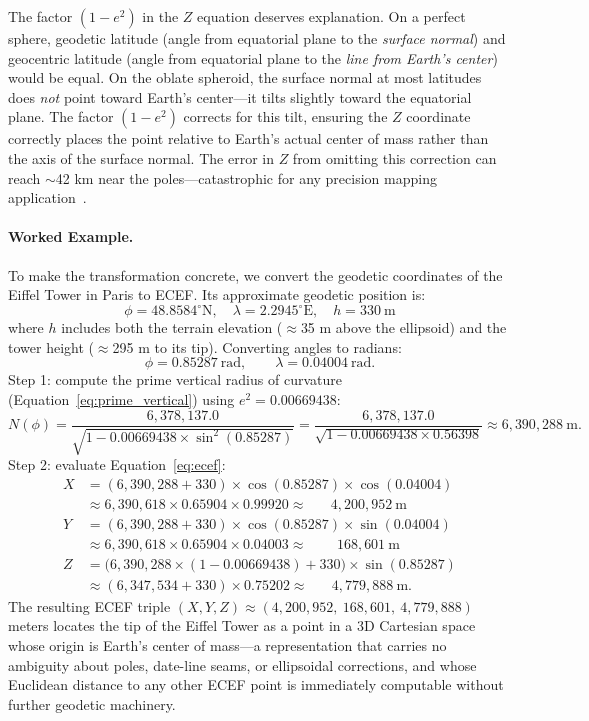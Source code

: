 \documentclass{book}
\begin{document}
The factor $(1 - e^2)$ in the $Z$ equation deserves explanation.
On a perfect sphere, geodetic latitude (angle from equatorial plane
to the \emph{surface normal}) and geocentric latitude (angle from
equatorial plane to the \emph{line from Earth's center}) would be
equal.  On the oblate spheroid, the surface normal at most latitudes
does \emph{not} point toward Earth's center---it tilts slightly toward
the equatorial plane.  The factor $(1-e^2)$ corrects for this tilt,
ensuring the $Z$ coordinate correctly places the point relative to
Earth's actual center of mass rather than the axis of the surface
normal.  The error in $Z$ from omitting this correction can reach
$\sim$42 km near the poles---catastrophic for any precision mapping
application~\cite{bowring1985geodetic}.

\paragraph{Worked Example.}

To make the transformation concrete, we convert the geodetic
coordinates of the Eiffel Tower in Paris to ECEF.  Its approximate
geodetic position is:
\[
  \phi = 48.8584^\circ\text{N}, \quad
  \lambda = 2.2945^\circ\text{E}, \quad
  h = 330\ \text{m}
\]
where $h$ includes both the terrain elevation ($\approx$35 m above
the ellipsoid) and the tower height ($\approx$295 m to its tip).
Converting angles to radians:
\[
  \phi = 0.85287\ \text{rad}, \qquad
  \lambda = 0.04004\ \text{rad}.
\]
Step 1: compute the prime vertical radius of curvature
(Equation~\ref{eq:prime_vertical}) using $e^2 = 0.00669438$:
\[
  N(\phi) = \frac{6{,}378{,}137.0}{\sqrt{1 - 0.00669438 \times \sin^2(0.85287)}}
           = \frac{6{,}378{,}137.0}{\sqrt{1 - 0.00669438 \times 0.56398}}
           \approx 6{,}390{,}288\ \text{m}.
\]
Step 2: evaluate Equation~\eqref{eq:ecef}:
\begin{align*}
  X &= (6{,}390{,}288 + 330)\times\cos(0.85287)\times\cos(0.04004) \\
    &\approx 6{,}390{,}618 \times 0.65904 \times 0.99920
     \approx\ \ \phantom{-}4{,}200{,}952\ \text{m} \\[4pt]
  Y &= (6{,}390{,}288 + 330)\times\cos(0.85287)\times\sin(0.04004) \\
    &\approx 6{,}390{,}618 \times 0.65904 \times 0.04003
     \approx\ \ \phantom{-}\ \ 168{,}601\ \text{m} \\[4pt]
  Z &= \bigl(6{,}390{,}288\times(1 - 0.00669438) + 330\bigr)\times\sin(0.85287) \\
    &\approx (6{,}347{,}534 + 330)\times 0.75202
     \approx\ \ \phantom{-}4{,}779{,}888\ \text{m}.
\end{align*}
The resulting ECEF triple
$(X, Y, Z) \approx (4{,}200{,}952,\ 168{,}601,\ 4{,}779{,}888)$ meters
locates the tip of the Eiffel Tower as a point in a 3D Cartesian
space whose origin is Earth's center of mass---a representation that
carries no ambiguity about poles, date-line seams, or ellipsoidal
corrections, and whose Euclidean distance to any other ECEF point is
immediately computable without further geodetic machinery.
\end{document}
